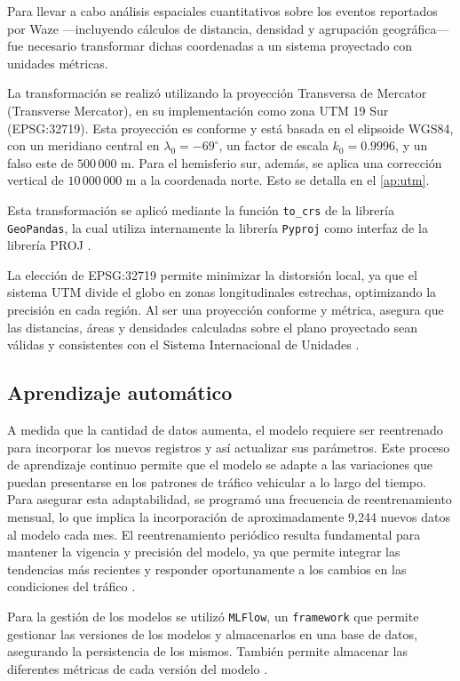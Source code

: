 \documentclass[12pt]{article}
\begin{document}
Para llevar a cabo análisis espaciales cuantitativos sobre los eventos reportados por Waze —incluyendo cálculos de distancia, densidad y agrupación geográfica— fue necesario transformar dichas coordenadas a un sistema proyectado con unidades métricas.

La transformación se realizó utilizando la proyección Transversa de Mercator (Transverse Mercator), en su implementación como zona UTM 19 Sur (EPSG:32719). Esta proyección es conforme y está basada en el elipsoide WGS84, con un meridiano central en $\lambda_0 = -69^\circ$, un factor de escala $k_0 = 0.9996$, y un falso este de $500\,000$ m. Para el hemisferio sur, además, se aplica una corrección vertical de $10\,000\,000$ m a la coordenada norte. Esto se detalla en el \autoref{ap:utm}.

Esta transformación se aplicó mediante la función \texttt{to\_crs} de la librería \texttt{GeoPandas}, la cual utiliza internamente la librería \texttt{Pyproj} como interfaz de la librería PROJ \parencite{gdal_proj, pyproj, geopandas}.

La elección de EPSG:32719 permite minimizar la distorsión local, ya que el sistema UTM divide el globo en zonas longitudinales estrechas, optimizando la precisión en cada región. Al ser una proyección conforme y métrica, asegura que las distancias, áreas y densidades calculadas sobre el plano proyectado sean válidas y consistentes con el Sistema Internacional de Unidades \parencite{epsg32719}.

\subsection{Aprendizaje automático}

A medida que la cantidad de datos aumenta, el modelo requiere ser reentrenado para incorporar los nuevos registros y así actualizar sus parámetros. Este proceso de aprendizaje continuo permite que el modelo se adapte a las variaciones que puedan presentarse en los patrones de tráfico vehicular a lo largo del tiempo. Para asegurar esta adaptabilidad, se programó una frecuencia de reentrenamiento mensual, lo que implica la incorporación de aproximadamente 9,244 nuevos datos al modelo cada mes. El reentrenamiento periódico resulta fundamental para mantener la vigencia y precisión del modelo, ya que permite integrar las tendencias más recientes y responder oportunamente a los cambios en las condiciones del tráfico \parencite{gama2014concept}.


Para la gestión de los modelos se utilizó \texttt{MLFlow}, un \texttt{framework} que permite gestionar las versiones de los modelos y almacenarlos en una base de datos, asegurando la persistencia de los mismos. También permite almacenar las diferentes métricas de cada versión del modelo \parencite{mlflow2025}.
\end{document}
